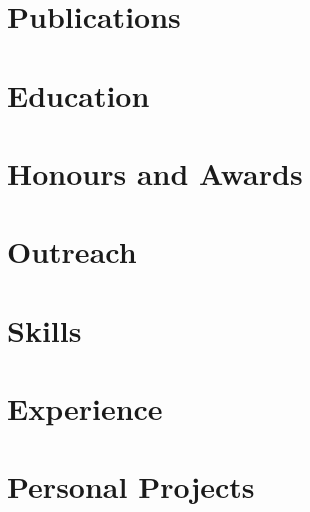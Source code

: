 \documentclass[english,a4paper,10pt]{extarticle}
\begin{document}
\def\role{} %

\pagestyle{normal_page}
\thispagestyle{first_page}

% 

\section{Publications}


\section{Education}


\section{Honours and Awards}


\section{Outreach}


\section{Skills}


\section{Experience}


\newpage
\section{Personal Projects}



\thispagestyle{last_page}

\end{document}
